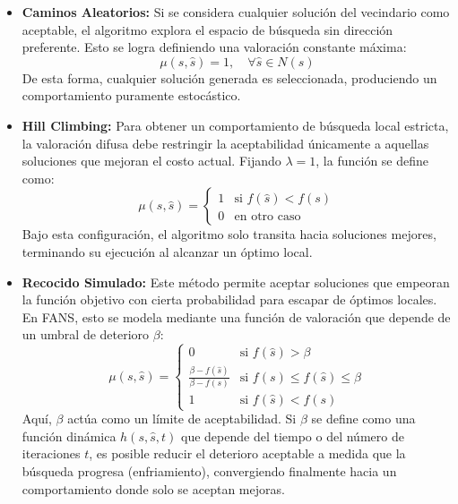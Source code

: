 \documentclass{article}
\begin{document}
\begin{itemize}
    \item \textbf{Caminos Aleatorios:}
    Si se considera cualquier solución del vecindario como aceptable, el algoritmo explora el espacio de búsqueda sin dirección preferente. Esto se logra definiendo una valoración constante máxima:
    \begin{equation}
        \mu(s, \hat{s}) = 1, \quad \forall \hat{s} \in N(s)
    \end{equation}
    De esta forma, cualquier solución generada es seleccionada, produciendo un comportamiento puramente estocástico.

    \item \textbf{Hill Climbing:}
    Para obtener un comportamiento de búsqueda local estricta, la valoración difusa debe restringir la aceptabilidad únicamente a aquellas soluciones que mejoran el costo actual. Fijando $\lambda = 1$, la función se define como:
    \begin{equation}
        \mu(s, \hat{s}) = 
        \begin{cases} 
            1 & \text{si } f(\hat{s}) < f(s) \\
            0 & \text{en otro caso}
        \end{cases}
    \end{equation}
    Bajo esta configuración, el algoritmo solo transita hacia soluciones mejores, terminando su ejecución al alcanzar un óptimo local.

    \item \textbf{Recocido Simulado:}
    Este método permite aceptar soluciones que empeoran la función objetivo con cierta probabilidad para escapar de óptimos locales. En FANS, esto se modela mediante una función de valoración que depende de un umbral de deterioro $\beta$:
    \begin{equation}
        \mu(s, \hat{s}) = 
        \begin{cases} 
            0 & \text{si } f(\hat{s}) > \beta \\
            \frac{\beta - f(\hat{s})}{\beta - f(s)} & \text{si } f(s) \le f(\hat{s}) \le \beta \\
            1 & \text{si } f(\hat{s}) < f(s)
        \end{cases}
    \end{equation}
    Aquí, $\beta$ actúa como un límite de aceptabilidad. Si $\beta$ se define como una función dinámica $h(s, \hat{s}, t)$ que depende del tiempo o del número de iteraciones $t$, es posible reducir el deterioro aceptable a medida que la búsqueda progresa (enfriamiento), convergiendo finalmente hacia un comportamiento donde solo se aceptan mejoras.
\end{itemize}
\end{document}
